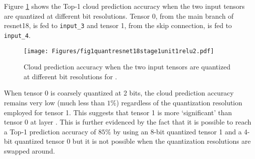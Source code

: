 %





Figure \ref{fig:expt:quant:s1u1r2:pred} shows the Top-1 cloud prediction accuracy when the two input tensors are quantized at different bit resolutions. Tensor 0, from the main branch of \gls{resnet18}, is fed to \verb|input_3| and tensor 1, from the skip connection, is fed to \verb|input_4|.

\begin{figure}[H]
	\centering 
	\texttt{[image: Figures/fig1quantresnet18stage1unit1relu2.pdf]}
	\caption[Prediction accuracy for stage 1 unit 1 relu 2 quantization experiment]{Cloud prediction accuracy when the two input tensors are quantized at different bit resolutions for \soneunitonerelutwo.}
	\label{fig:expt:quant:s1u1r2:pred}
\end{figure}

When tensor 0 is coarsely quantized at 2 bits, the cloud prediction accuracy remains very low (much less than $1\%$) regardless of the quantization resolution employed for tensor 1. This suggests that tensor 1 is more `significant' than tensor 0 at layer \soneunitonerelutwo. This is further evidenced by the fact that it is possible to reach a Top-1 prediction accuracy of $85\%$ by using an 8-bit quantized tensor 1 and a 4-bit quantized tensor 0 but it is not possible when the quantization resolutions are swapped around.

